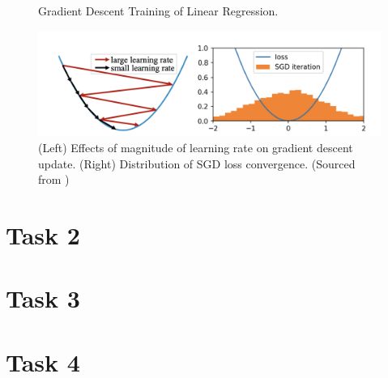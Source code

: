 \documentclass{article}
\begin{document}
\begin{figure}[H]
    \caption{Gradient Descent Training of Linear Regression.}
    \label{fig:gd_training}
\end{figure}

\begin{figure}[H]
    \includegraphics[width=\textwidth]{Figures/sgd_update.png} 
    \caption{(Left) Effects of magnitude of learning rate on gradient descent update. (Right) Distribution of SGD loss convergence. (Sourced from \cite{liu2021noise})}
    \label{fig:sgd_noise}
\end{figure}





\section{Task 2}

\section{Task 3}

\section{Task 4}

\printbibliography
\end{document}
